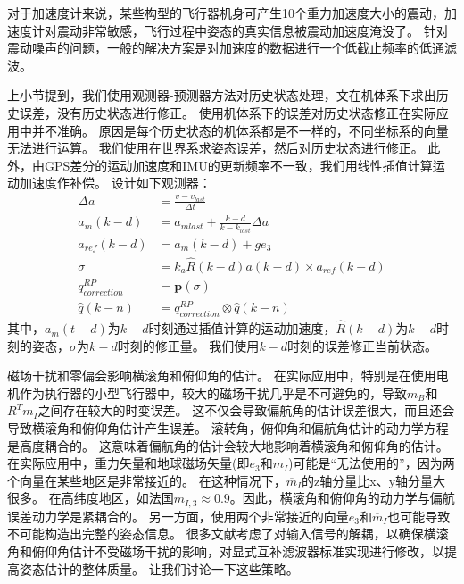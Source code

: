 \documentclass[
  type=master
]{gdutthesis}
\begin{document}
对于加速度计来说，某些构型的飞行器机身可产生10个重力加速度大小的震动，加速度计对震动非常敏感，飞行过程中姿态的真实信息被震动加速度淹没了。
针对震动噪声的问题，一般的解决方案是对加速度的数据进行一个低截止频率的低通滤波。

上小节提到，我们使用观测器-预测器方法对历史状态处理，文\cite{khosravian2014velocity}在机体系下求出历史误差，没有历史状态进行修正。
使用机体系下的误差对历史状态修正在实际应用中并不准确。
原因是每个历史状态的机体系都是不一样的，不同坐标系的向量无法进行运算。
我们使用在世界系求姿态误差，然后对历史状态进行修正。
此外，由GPS差分的运动加速度和IMU的更新频率不一致，我们用线性插值计算运动加速度作补偿。
设计如下观测器：
\begin{equation}\label{eq:myrpcorrection}
	\begin{aligned}
		\Delta a &= \frac{v - v_{last}}{\Delta t}\\
		a_m (k-d) &= a_{mlast} + \frac{k-d}{k-k_{last}} \Delta a\\
		a_{ref} (k-d) &= a_m (k-d) + g e_3\\
		\sigma &= k_a \hat{R}(k-d) a(k-d) \times a_{ref}(k-d)\\
		q_{correction}^{RP} &= \mathbf{p}(\sigma)\\
		\hat{q}(k-n) &= q_{correction}^{RP} \otimes \hat{q}(k-n)
	\end{aligned}
\end{equation}
其中，$a_m (t-d)$为$k-d$时刻通过插值计算的运动加速度，$\hat{R}(k-d)$为$k-d$时刻的姿态，$\sigma$为$k-d$时刻的修正量。
我们使用$k-d$时刻的误差修正当前状态。

磁场干扰和零偏会影响横滚角和俯仰角的估计。
在实际应用中，特别是在使用电机作为执行器的小型飞行器中，较大的磁场干扰几乎是不可避免的，导致$m_B$和$R^T m_I$之间存在较大的时变误差。
这不仅会导致偏航角的估计误差很大，而且还会导致横滚角和俯仰角估计产生误差。
滚转角，俯仰角和偏航角估计的动力学方程是高度耦合的。
这意味着偏航角的估计会较大地影响着横滚角和俯仰角的估计。
在实际应用中，重力矢量和地球磁场矢量(即$e_3$和$m_I$)可能是“无法使用的”，因为两个向量在某些地区是非常接近的。
在这种情况下，$\overline{m}_I$的z轴分量比x、y轴分量大很多。
在高纬度地区，如法国$\overline{m}_{I,3}\approx 0.9$。因此，横滚角和俯仰角的动力学与偏航误差动力学是紧耦合的。
另一方面，使用两个非常接近的向量$e_3$和$\overline{m}_I$也可能导致不可能构造出完整的姿态信息。
很多文献考虑了对输入信号的解耦，以确保横滚角和俯仰角估计不受磁场干扰的影响，对显式互补滤波器标准实现进行修改，以提高姿态估计的整体质量。
让我们讨论一下这些策略。
\end{document}
